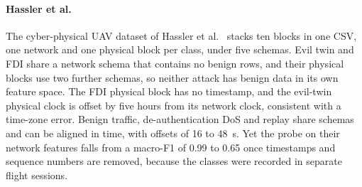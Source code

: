 \paragraph{Hassler et al.}
The cyber-physical UAV dataset of Hassler et al.~\cite{hassler2024uav,hassler2024uavData}
stacks ten blocks in one CSV, one network and one physical block per class, under five
schemas. Evil twin and FDI share a network schema that contains no benign rows, and
their physical blocks use two further schemas, so neither attack has benign data in its
own feature space. The FDI physical block has no timestamp, and the evil-twin physical
clock is offset by five hours from its network clock, consistent with a time-zone error.
Benign traffic, de-authentication DoS and replay share schemas and can be aligned in
time, with offsets of 16 to 48~s. Yet the probe on their network features falls from a
macro-F1 of 0.99 to 0.65 once timestamps and sequence numbers are removed, because the
classes were recorded in separate flight sessions.

